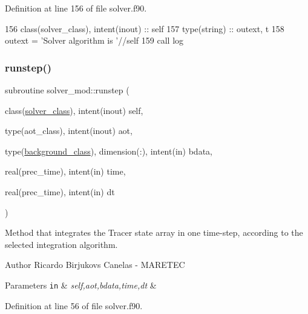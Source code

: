 Definition at line 156 of file solver.\+f90.


\begin{DoxyCode}
156     \textcolor{keywordtype}{class}(solver\_class), \textcolor{keywordtype}{intent(inout)} :: self
157     \textcolor{keywordtype}{type}(string) :: outext, t
158     outext = \textcolor{stringliteral}{'Solver algorithm is '}//self%
159     \textcolor{keyword}{call }log%
\end{DoxyCode}
\mbox{\label{namespacesolver__mod_ab87d71c6c8aa1709901ec14f9bf12505}} 
\subsubsection{\texorpdfstring{runstep()}{runstep()}}
{\footnotesize\ttfamily subroutine solver\+\_\+mod\+::runstep (\begin{DoxyParamCaption}\item[{class(\mbox{\hyperlink{structsolver__mod_1_1solver__class}{solver\+\_\+class}}), intent(inout)}]{self,  }\item[{type(aot\+\_\+class), intent(inout)}]{aot,  }\item[{type(\mbox{\hyperlink{structbackground__mod_1_1background__class}{background\+\_\+class}}), dimension(\+:), intent(in)}]{bdata,  }\item[{real(prec\+\_\+time), intent(in)}]{time,  }\item[{real(prec\+\_\+time), intent(in)}]{dt }\end{DoxyParamCaption})\hspace{0.3cm}{\ttfamily [private]}}



Method that integrates the Tracer state array in one time-\/step, according to the selected integration algorithm. 

\begin{DoxyAuthor}{Author}
Ricardo Birjukovs Canelas -\/ M\+A\+R\+E\+T\+EC 
\end{DoxyAuthor}

\begin{DoxyParams}[1]{Parameters}
\mbox{\tt in}  & {\em self,aot,bdata,time,dt} & \\
\hline
\end{DoxyParams}


Definition at line 56 of file solver.\+f90.



